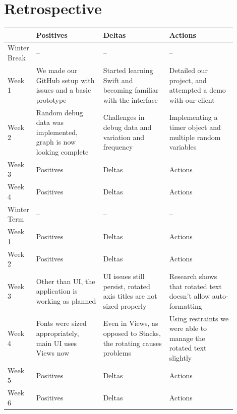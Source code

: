 \documentclass[onecolumn, draftclsnofoot,10pt, compsoc]{IEEEtran}
\begin{document}
\section{Retrospective}
\begin{center}
	\begin{tabular}{| l | p{0.3\linewidth} | p{0.3\linewidth} | p{0.3\linewidth} |}
		\hline
		& Positives & Deltas & Actions \\ \hline
    Winter Break & --  & -- & -- \\ \hline
    Week 1 & We made our GitHub setup with issues and a basic prototype
           & Started learning Swift and becoming familiar with the interface
           & Detailed our project, and attempted a demo with our client \\ \hline
		Week 2 & Random debug data was implemented, graph is now looking complete
           & Challenges in debug data and variation and frequency
           & Implementing a timer object and multiple random variables \\ \hline
		Week 3 & Positives & Deltas & Actions \\ \hline
		Week 4 & Positives & Deltas & Actions \\ \hline

    Winter Term & -- & -- & -- \\ \hline
    Week 1 & Positives & Deltas & Actions \\ \hline
		Week 2 & Positives & Deltas & Actions \\ \hline
		Week 3 & Other than UI, the application is working as planned
           & UI issues still persist, rotated axis titles are not sized properly
           & Research shows that rotated text doesn't allow auto-formatting \\ \hline
		Week 4 & Fonts were sized appropriately, main UI uses Views now
           & Even in Views, as opposed to Stacks, the rotating causes problems
           & Using restraints we were able to manage the rotated text slightly \\ \hline
    Week 5 & Positives & Deltas & Actions \\ \hline
    Week 6 & Positives & Deltas & Actions \\ \hline

	\end{tabular}
\end{center}

\newpage


\end{document}
